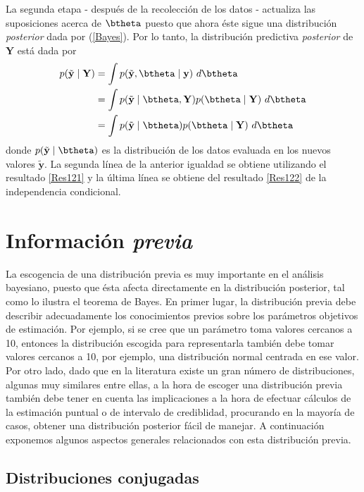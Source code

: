 La segunda etapa - después de la recolección de los datos - actualiza las suposiciones acerca de $\btheta$ puesto que ahora éste sigue una distribución \emph{posterior} dada por (\ref{Bayes}). Por lo tanto, la distribución predictiva  \emph{posterior} de $\mathbf{Y}$ está dada por
\begin{align}\label{predictpos}
p(\tilde{\mathbf{y}} \mid \mathbf{Y})&=\int p(\tilde{\mathbf{y}},\btheta \mid \mathbf{y})\ d\btheta \notag \\
&=\int p(\tilde{\mathbf{y}} \mid \btheta,\mathbf{Y})p(\btheta \mid \mathbf{Y})\ d\btheta \notag \\
&=\int p(\tilde{\mathbf{y}} \mid \btheta)p(\btheta \mid \mathbf{Y})\ d\btheta
\end{align}
donde $p(\tilde{\mathbf{y}} \mid \btheta)$ es la distribución de los datos evaluada en los nuevos valores $\tilde{\mathbf{y}}$. La segunda línea de la anterior igualdad se obtiene utilizando el resultado \ref{Res121}  y la última línea se obtiene del resultado \ref{Res122} de la independencia condicional.

\section{Información \emph{previa}}

La escogencia de una distribución previa es muy importante en el análisis bayesiano, puesto que ésta afecta directamente en la distribución posterior, tal como lo ilustra el teorema de Bayes. En primer lugar, la distribución previa debe describir adecuadamente los conocimientos previos sobre los parámetros objetivos de estimación. Por ejemplo, si se cree que un parámetro toma valores cercanos a 10, entonces la distribución escogida para representarla también debe tomar valores cercanos a 10, por ejemplo, una distribución normal centrada en ese valor. Por otro lado, dado que en la literatura existe un gran número de distribuciones, algunas muy similares entre ellas, a la hora de escoger una distribución previa también debe tener en cuenta las implicaciones a la hora de efectuar cálculos de la estimación puntual o de intervalo de crediblidad, procurando en la mayoría de casos, obtener una distribución posterior fácil de manejar. A continuación exponemos algunos aspectos generales relacionados con esta distribución previa.

\subsection{Distribuciones conjugadas}

